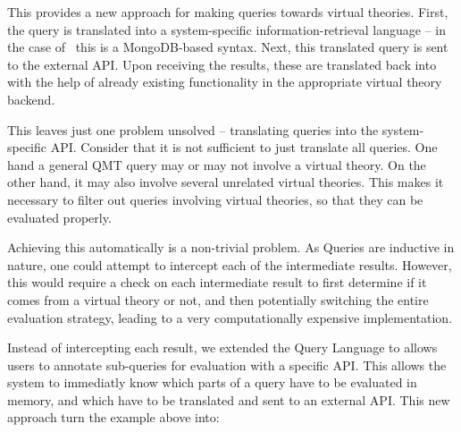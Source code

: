 This provides a new approach for making queries towards virtual theories. 
First, the \mmt query is translated into a system-specific information-retrieval language -- in the case of \lmfdb\ this is a MongoDB-based syntax.
Next, this translated query is sent to the external API. 
Upon receiving the results, these are translated back into \ommt with the help of already existing functionality in the appropriate virtual theory backend.

This leaves just one problem unsolved -- translating queries into the system-specific API. 
Consider that it is not sufficient to just translate all queries. 
One hand a general QMT query may or may not involve a virtual theory. 
On the other hand, it may also involve several unrelated virtual theories. 
This makes it necessary to filter out queries involving virtual theories, so that they can be evaluated properly. 

Achieving this automatically is a non-trivial problem. 
As Queries are inductive in nature, one could attempt to intercept each of the intermediate results. 
However, this would require a check on each intermediate result to first determine if it comes from a virtual theory or not, and then potentially switching the entire evaluation strategy, leading to a very computationally expensive implementation. 

Instead of intercepting each result, we extended the Query Language to allows users to annotate sub-queries for evaluation with a specific API. 
This allows the system to immediatly know which parts of a query have to be evaluated in \mmt memory, and which have to be translated and sent to an external API. 
This new approach turn the example above into:



